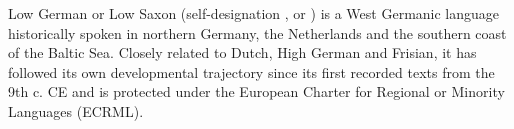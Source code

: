 Low German or Low Saxon (self-designation ,  or ) is a West Germanic language historically spoken in northern Germany, the Netherlands and the southern coast of the Baltic Sea. Closely related to Dutch, High German and Frisian, it has followed its own developmental trajectory since its first recorded texts from the 9th c. CE \cite{price-2010-heliand-phd} and is protected under the European Charter for Regional or Minority Languages (ECRML).
